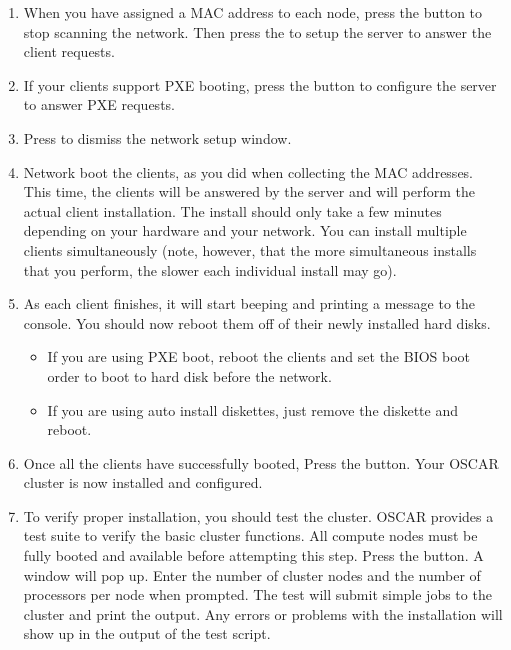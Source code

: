 \begin {enumerate}

\item When you have assigned a MAC address to each node, press the
   button to stop scanning the network. Then
  press the  to setup the server to
  answer the client requests.


\item If your clients support PXE booting, press the  button to configure the server to answer PXE
  requests.


\item Press  to dismiss the network setup window.
  
\item Network boot the clients, as you did when collecting the MAC
  addresses. This time, the clients will be answered by the server and
  will perform the actual client installation. The install should only
  take a few minutes depending on your hardware and your network.  You
  can install multiple clients simultaneously (note, however, that the
  more simultaneous installs that you perform, the slower each
  individual install may go).

  
\item As each client finishes, it will start beeping and printing a
  message to the console. You should now reboot them off of their
  newly installed hard disks.

  \begin{itemize}
  \item If you are using PXE boot, reboot the clients and set the BIOS
    boot order to boot to hard disk before the network.
  \item If you are using auto install diskettes, just remove the
    diskette and reboot.
  \end{itemize}

  
\item Once all the clients have successfully booted, Press the
   button. Your OSCAR cluster is now
  installed and configured.

  
\item To verify proper installation, you should test the cluster.
  OSCAR provides a test suite to verify the basic cluster functions.
  All compute nodes must be fully booted and available before
  attempting this step.  Press the  button.
  A window will pop up.  Enter the number of cluster nodes and the
  number of processors per node when prompted. The test will submit
  simple jobs to the cluster and print the output. Any errors or
  problems with the installation will show up in the output of the
  test script.


\end{enumerate}

